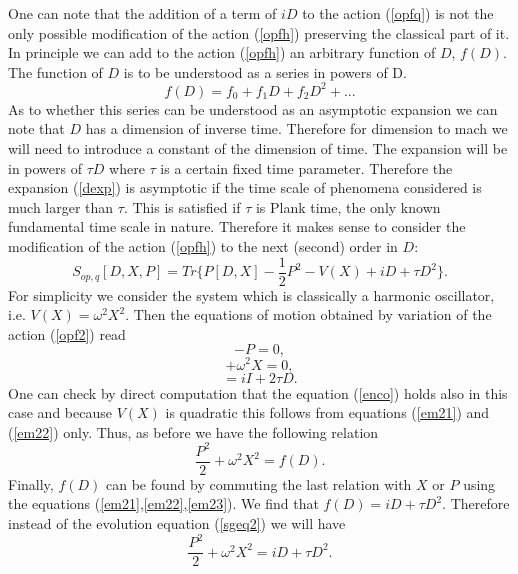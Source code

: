 \documentclass[a4paper,11pt]{article}
\begin{document}
 One can note that the addition of a term of $iD$ to
the action (\ref{opfq}) is not the only possible modification of
the action (\ref{opfh}) preserving the classical part of it. In
principle we can add to the action (\ref{opfh}) an arbitrary
function of $D$, $f(D)$. The function of $D$ is to be understood
as a series in powers of D.
\begin{equation}
f(D)=f_0 +f_1 D +f_2 D^2 + ... \label{dexp}
\end{equation}
As to whether this series can be understood as an asymptotic
expansion we can note that $D$ has a dimension of inverse time.
Therefore for dimension to mach we will need to introduce a
constant of the dimension of time. The expansion will be in powers
of $\tau D$ where $\tau$ is a certain fixed time parameter.
Therefore the expansion (\ref{dexp}) is asymptotic if the time
scale of phenomena considered is much larger than $\tau$. This is
satisfied if $\tau$ is Plank time, the only known fundamental time
scale in nature. Therefore it makes sense to consider the
modification of the action (\ref{opfh}) to the next (second) order
in $D$:
\begin{equation}
S_{op,q}[D,X,P]=Tr \Big\{ P[D,X]-\frac{1}{2}P^2 - V(X)+iD+\tau D^2
\Big\}. \label{opf2}
\end{equation}
For simplicity we consider the system which is classically a
harmonic oscillator, i.e. $V(X)=\omega^2 X^2$. Then the equations
of motion obtained by variation of the action (\ref{opf2}) read
\begin{equation}
[D,X]-P=0, \label{em21}
\end{equation}
\begin{equation}
[D,P] + \omega^2 X=0, \label{em22}
\end{equation}
\begin{equation}
[P,X]=iI+2\tau D. \label{em23}
\end{equation}
One can check by direct computation that the equation (\ref{enco})
holds also in this case and because $V(X)$ is quadratic this
follows from equations (\ref{em21}) and (\ref{em22}) only. Thus,
as before we have the following relation
\begin{equation}
\frac{P^2}{2}+\omega^2 X^2=f(D). \label{enco2}
\end{equation}
Finally, $f(D)$ can be found by commuting the last relation with
$X$ or $P$ using the equations (\ref{em21},\ref{em22},\ref{em23}).
We find that $f(D)=iD+\tau D^2$. Therefore instead of the
evolution equation (\ref{sgeq2}) we will have
\begin{equation}
\frac{P^2}{2}+\omega^2 X^2=iD+\tau D^2. \label{schreq2}
\end{equation}
\end{document}
